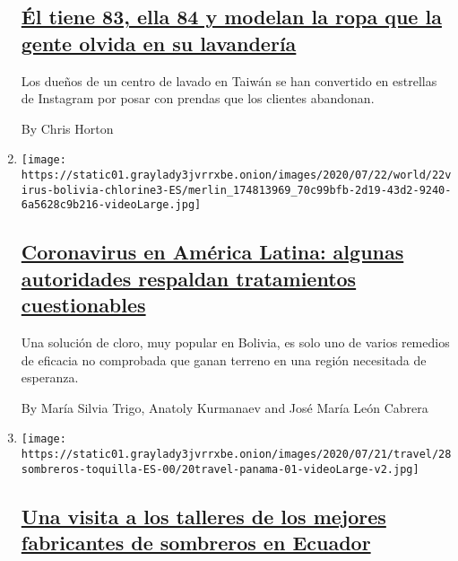 \begin{enumerate}
{  \subsection{\texorpdfstring{\href{/es/2020/07/28/espanol/mundo/lavanderia-taiwanesa-instagram.html}{Él
  tiene 83, ella 84 y modelan la ropa que la gente olvida en su
  lavandería}}{Él tiene 83, ella 84 y modelan la ropa que la gente olvida en su lavandería}}\label{uxe9l-tiene-83-ella-84-y-modelan-la-ropa-que-la-gente-olvida-en-su-lavanderuxeda}}

  Los dueños de un centro de lavado en Taiwán se han convertido en
  estrellas de Instagram por posar con prendas que los clientes
  abandonan.

  By Chris Horton
\item
  \texttt{[image: https://static01.graylady3jvrrxbe.onion/images/2020/07/22/world/22virus-bolivia-chlorine3-ES/merlin\_174813969\_70c99bfb-2d19-43d2-9240-6a5628c9b216-videoLarge.jpg]}

  \hypertarget{coronavirus-en-amuxe9rica-latina-algunas-autoridades-respaldan-tratamientos-cuestionables}{%
  \subsection{\texorpdfstring{\href{/es/2020/07/23/espanol/america-latina/bolivia-cloro-coronavirus-ivermectina.html}{Coronavirus
  en América Latina: algunas autoridades respaldan tratamientos
  cuestionables}}{Coronavirus en América Latina: algunas autoridades respaldan tratamientos cuestionables}}\label{coronavirus-en-amuxe9rica-latina-algunas-autoridades-respaldan-tratamientos-cuestionables}}

  Una solución de cloro, muy popular en Bolivia, es solo uno de varios
  remedios de eficacia no comprobada que ganan terreno en una región
  necesitada de esperanza.

  By María Silvia Trigo, Anatoly Kurmanaev and José María León Cabrera
\item
  \texttt{[image: https://static01.graylady3jvrrxbe.onion/images/2020/07/21/travel/28sombreros-toquilla-ES-00/20travel-panama-01-videoLarge-v2.jpg]}

  \hypertarget{una-visita-a-los-talleres-de-los-mejores-fabricantes-de-sombreros-en-ecuador}{%
  \subsection{\texorpdfstring{\href{/es/2020/07/28/espanol/estilos-de-vida/sombreros-toquilla-panama-ecuador.html}{Una
  visita a los talleres de los mejores fabricantes de sombreros en
  Ecuador}}{Una visita a los talleres de los mejores fabricantes de sombreros en Ecuador}}\label{una-visita-a-los-talleres-de-los-mejores-fabricantes-de-sombreros-en-ecuador}}


\end{enumerate}
